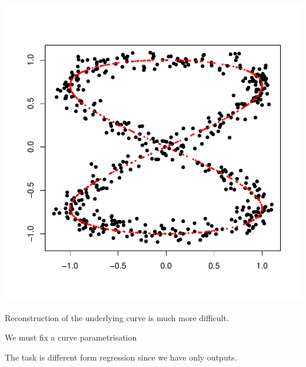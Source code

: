 \documentclass[landscape,footrule]{foils}
\begin{document}
\begin{center}
\includegraphics[scale=0.75]{principal-curve.pdf}
\end{center}\vspace*{-1cm}

Reconstruction of the underlying curve is much more difficult.
\begin{triangles}
\item We must fix a curve parametrisation 
\item The task is different form regression since we have only outputs.
\end{triangles} 
 


\end{document}
